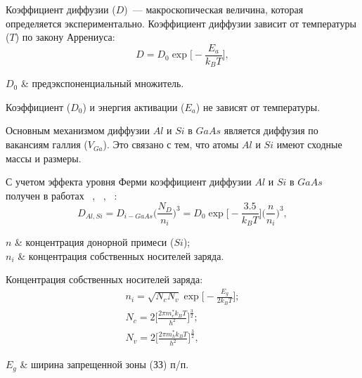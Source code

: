 
Коэффициент диффузии ($D$)~--- макроскопическая величина, которая определяется экспериментально. Коэффициент диффузии зависит от температуры ($T$) по закону Аррениуса:
\begin{equation}
	\label{eq:DConst}
	D = D_{0}\exp\bigg[-\frac{E_{a}}{k_{B}T}\bigg],
\end{equation}
\begin{conditions}
	$D_{0}$ & предэкспоненциальный множитель.
\end{conditions}
Коэффициент ($D_{0}$) и энергия активации ($E_{a}$) не зависят от температуры.

Основным механизмом диффузии $Al$ и $Si$ в $GaAs$ является диффузия по вакансиям галлия ($V_{Ga}$). Это связано с тем, что атомы $Al$ и $Si$ имеют сходные массы и размеры. 

С учетом эффекта уровня Ферми коэффициент диффузии $Al$ и $Si$ в $GaAs$ получен в работах ~\cite{getMeshkov}, ~\cite{Makeev}, ~\cite{Gosele}:
\begin{equation}
	\label{eq:DNd}
	D_{Al,Si} = D_{i-GaAs}\Big( \frac{N_{D}}{n_{i}} \Big)^{3} = D_{0}\exp\bigg[-\frac{3.5}{k_{B}T}\bigg]\Big( \frac{n}{n_{i}} \Big)^{3},
\end{equation}
\begin{conditions}
	$n$ & концентрация донорной примеси ($Si$);\\
	$n_{i}$ & концентрация собственных носителей заряда.
\end{conditions}

Концентрация собственных носителей заряда:
\begin{gather}
	n_{i} = \sqrt{N_{c}N_{v}}\exp\!\bigg[ - \frac{E_{g}}{2k_{B}T} \bigg];\\
	N_{c} = 2\Big[ \frac{2\pi m_{e}^{\ast}k_{B}T}{h^{2}} \Big]^{\frac{3}{2}};\\
	N_{v} = 2\Big[ \frac{2\pi m_{h}^{\ast}k_{B}T}{h^{2}} \Big]^{\frac{3}{2}},
\end{gather}
\begin{conditions}
	$E_{g}$ & ширина запрещенной зоны (ЗЗ) п/п.
\end{conditions}

